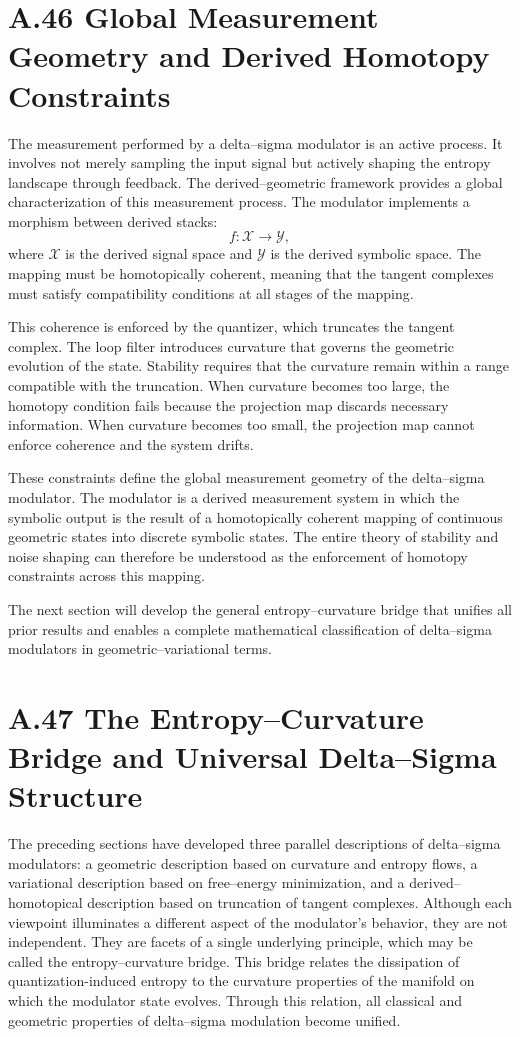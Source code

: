 \section{A.46 Global Measurement Geometry and Derived Homotopy Constraints}

The measurement performed by a delta–sigma modulator is an active process. It involves not merely sampling the input signal but actively shaping the entropy landscape through feedback. The derived–geometric framework provides a global characterization of this measurement process. The modulator implements a morphism between derived stacks:
\[
f : \mathcal{X} \longrightarrow \mathcal{Y},
\]
where \(\mathcal{X}\) is the derived signal space and \(\mathcal{Y}\) is the derived symbolic space. The mapping must be homotopically coherent, meaning that the tangent complexes must satisfy compatibility conditions at all stages of the mapping.

This coherence is enforced by the quantizer, which truncates the tangent complex. The loop filter introduces curvature that governs the geometric evolution of the state. Stability requires that the curvature remain within a range compatible with the truncation. When curvature becomes too large, the homotopy condition fails because the projection map discards necessary information. When curvature becomes too small, the projection map cannot enforce coherence and the system drifts.

These constraints define the global measurement geometry of the delta–sigma modulator. The modulator is a derived measurement system in which the symbolic output is the result of a homotopically coherent mapping of continuous geometric states into discrete symbolic states. The entire theory of stability and noise shaping can therefore be understood as the enforcement of homotopy constraints across this mapping.

The next section will develop the general entropy–curvature bridge that unifies all prior results and enables a complete mathematical classification of delta–sigma modulators in geometric–variational terms.

\section{A.47 The Entropy–Curvature Bridge and Universal Delta–Sigma Structure}

The preceding sections have developed three parallel descriptions of delta–sigma modulators: a geometric description based on curvature and entropy flows, a variational description based on free–energy minimization, and a derived–homotopical description based on truncation of tangent complexes. Although each viewpoint illuminates a different aspect of the modulator’s behavior, they are not independent. They are facets of a single underlying principle, which may be called the entropy–curvature bridge. This bridge relates the dissipation of quantization-induced entropy to the curvature properties of the manifold on which the modulator state evolves. Through this relation, all classical and geometric properties of delta–sigma modulation become unified.

